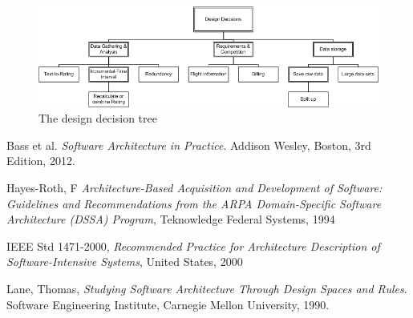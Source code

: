 \documentclass{article}
\begin{document}
\begin{figure}[!ht]
\includegraphics[width= 470px]{DDTree}
\caption{The design decision tree}
\label{fig:ddtree}
\end{figure}

\setcounter{table}{0}

\clearpage

\newpage

%
\newpage

%
\newpage

\newpage

\newpage

\newpage

\newpage

\newpage

\newpage


\clearpage

\clearpage


\clearpage
\begin{thebibliography}{9}

Bass et al.
  \emph{Software Architecture in Practice}.
  Addison Wesley, Boston,
  3rd Edition,
  2012.

 Hayes-Roth, F
 \emph{Architecture-Based Acquisition and Development of Software: Guidelines and Recommendations from the ARPA Domain-Speciﬁc
 Software Architecture (DSSA) Program},
 Teknowledge Federal Systems,
 1994

 IEEE Std 1471-2000,
 \emph{Recommended Practice for Architecture Description of Software-Intensive Systems},
 United States,
 2000

  Lane, Thomas,
  \emph{Studying Software Architecture Through Design Spaces and Rules}.
  Software Engineering Institute, Carnegie Mellon University,
  1990.

\end{thebibliography}
\end{document}
